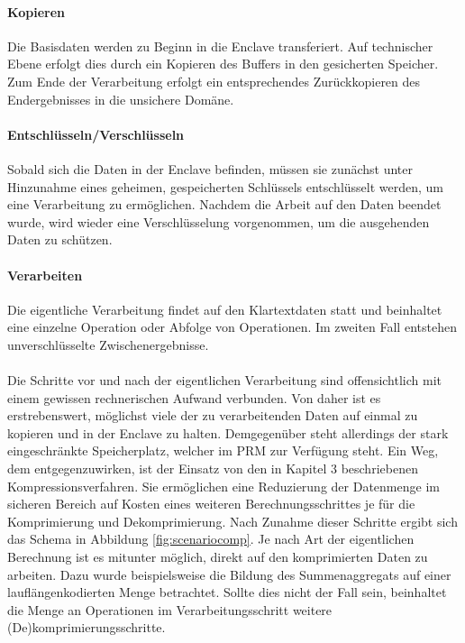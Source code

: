 \paragraph{Kopieren}
Die Basisdaten werden zu Beginn in die Enclave transferiert. Auf technischer Ebene erfolgt dies durch ein Kopieren des Buffers in den gesicherten Speicher. Zum Ende der Verarbeitung erfolgt ein entsprechendes Zurückkopieren des Endergebnisses in die unsichere Domäne.

\paragraph{Entschlüsseln/Verschlüsseln}
Sobald sich die Daten in der Enclave befinden, müssen sie zunächst unter Hinzunahme eines geheimen, gespeicherten Schlüssels entschlüsselt werden, um eine Verarbeitung zu ermöglichen. Nachdem die Arbeit auf den Daten beendet wurde, wird wieder eine Verschlüsselung vorgenommen, um die ausgehenden Daten zu schützen.

\paragraph{Verarbeiten}
Die eigentliche Verarbeitung findet auf den Klartextdaten statt und beinhaltet eine einzelne Operation oder Abfolge von Operationen. Im zweiten Fall entstehen unverschlüsselte Zwischenergebnisse.

\paragraph{}
Die Schritte vor und nach der eigentlichen Verarbeitung sind offensichtlich mit einem gewissen rechnerischen Aufwand verbunden. Von daher ist es erstrebenswert, möglichst viele der zu verarbeitenden Daten auf einmal zu kopieren und in der Enclave zu halten. Demgegenüber steht allerdings der stark eingeschränkte Speicherplatz, welcher im \ac{PRM} zur Verfügung steht. Ein Weg, dem entgegenzuwirken, ist der Einsatz von den in Kapitel 3 beschriebenen Kompressionsverfahren. Sie ermöglichen eine Reduzierung der Datenmenge im sicheren Bereich auf Kosten eines weiteren Berechnungsschrittes je für die Komprimierung und Dekomprimierung. Nach Zunahme dieser Schritte ergibt sich das Schema in Abbildung \ref{fig:scenariocomp}. Je nach Art der eigentlichen Berechnung ist es mitunter möglich, direkt auf den komprimierten Daten zu arbeiten. Dazu wurde beispielsweise die Bildung des Summenaggregats auf einer lauflängenkodierten Menge betrachtet. Sollte dies nicht der Fall sein, beinhaltet die Menge an Operationen im Verarbeitungsschritt weitere (De)komprimierungsschritte.

